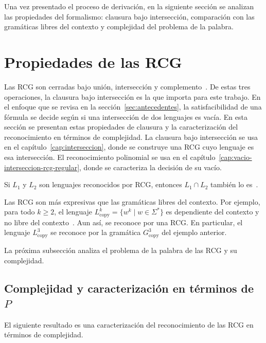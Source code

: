 Una vez presentado el proceso de derivación, en la siguiente sección se
analizan las propiedades del formalismo: clausura bajo intersección,
comparación con las gramáticas libres del contexto y complejidad del
problema de la palabra.

\section{Propiedades de las RCG}
\label{sec:propiedades-rcg}

Las RCG son cerradas bajo unión, intersección y
complemento~\cite{boullier1998proposal}. De estas tres operaciones, la
clausura bajo intersección es la que importa para este trabajo. En el
enfoque que
se revisa en la sección~\ref{sec:antecedentes}, la satisfacibilidad de
una fórmula se decide según si una intersección de dos lenguajes es
vacía. En esta sección se presentan estas propiedades de clausura y la
caracterización del reconocimiento en términos de complejidad. La
clausura bajo intersección se usa en el capítulo~\ref{cap:interseccion},
donde se construye una RCG cuyo lenguaje es esa intersección. El
reconocimiento polinomial se usa en el
capítulo~\ref{cap:vacio-interseccion-rcg-regular}, donde se caracteriza la
decisión de su vacío.

\begin{teorema}
\label{teo:clausura-rcg}
Si $L_1$ y $L_2$ son lenguajes reconocidos por RCG, entonces
$L_1 \cap L_2$ también lo es~\cite{boullier1998proposal}.
\end{teorema}

Las RCG son más expresivas que las gramáticas libres del contexto. Por
ejemplo, para todo $k \ge 2$, el lenguaje $L_{\mathrm{copy}}^k = \{ w^k
\mid w \in \Sigma^*\}$ es dependiente del contexto y no libre del
contexto~\cite{hopcroft2006introduction}. Aun así, se reconoce por una RCG. En
particular, el lenguaje $L_{\mathrm{copy}}^3$ se reconoce por la
gramática $G_{\mathrm{copy}}^3$ del ejemplo anterior.

La próxima subsección analiza el problema de la palabra de las RCG y su
complejidad.

\subsection{Complejidad y caracterización en términos de $P$}

El siguiente resultado es una caracterización del reconocimiento de las
RCG en términos de complejidad.

